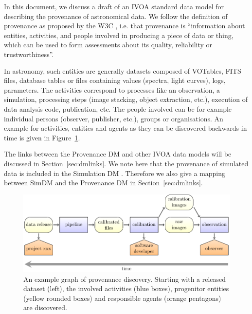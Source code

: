 
In this document, we discuss a draft of an IVOA standard data model for
describing the provenance of astronomical data. 
We follow the definition of provenance as proposed by the W3C \citep{std:W3CProvDM}, i.e. that provenance is ``information about entities, activities, and people involved in producing a piece of data or thing, which can be used to form assessments about its quality, reliability or trustworthiness''.

In astronomy, such entities are generally datasets composed of VOTables, FITS
files, database tables or files containing values (spectra, light curves), logs,
parameters.
The activities correspond to processes like an observation, a
simulation, processing steps (image stacking, object extraction, etc.), execution of data analysis code, publication, etc.
The people involved can be for example individual persons (observer, publisher, etc.), groups or organisations. An example for activities, entities and agents as they can be discovered backwards in time is given in Figure~\ref{fig:example-workflow}.

The links between the Provenance DM and other IVOA data models will be discussed in Section~\ref{sec:dmlinks}. We note here that the provenance of simulated data is included in the Simulation DM \citep[SimDM,][]{std:SimDM}. Therefore we also give a mapping between SimDM and the Provenance DM in Section~\ref{sec:dmlinks}.

\begin{figure}[ht]
\centering
\includegraphics[width=1\textwidth]{workflow-backwards.pdf}
\caption[Example graph of provenance discovery]{An example graph of provenance discovery. Starting with a released dataset (left), the involved activities (blue boxes), 
progenitor entities (yellow rounded boxes) and responsible agents (orange pentagons) are 
discovered.}
\label{fig:example-workflow}
\end{figure}






